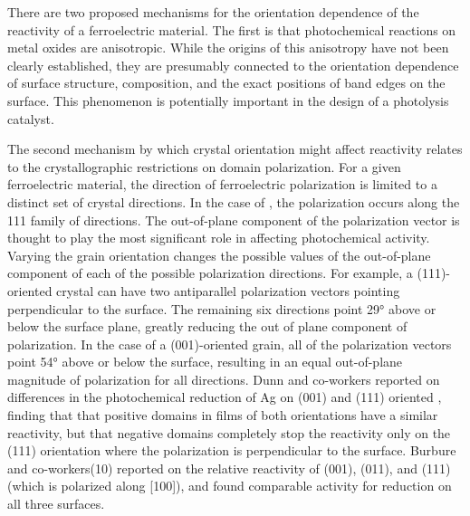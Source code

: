 There are two proposed mechanisms for the orientation dependence of the reactivity of a ferroelectric material. The first is that photochemical reactions on metal oxides are anisotropic.\cite{Giocondi:2003wc,Lowekamp:1998ks,MorrisHotsenpiller:1998jq,Ohno:2002fn,Taguchi:2003hs} While the origins of this anisotropy have not been clearly established, they are presumably connected to the orientation dependence of surface structure, composition, and the exact positions of band edges on the surface. \cite{Giocondi:2003wc,Giocondi:2007fa} This phenomenon is potentially important in the design of a photolysis catalyst.\cite{Sosnowchik:2010jr}

The second mechanism by which crystal orientation might affect reactivity relates to the crystallographic restrictions on domain polarization. For a given ferroelectric material, the direction of ferroelectric polarization is limited to a distinct set of crystal directions. In the case of , the polarization occurs along the 111 family of directions.\cite{Anonymous:2011wx} The out-of-plane component of the polarization vector is thought to play the most significant role in affecting photochemical activity. Varying the grain orientation changes the possible values of the out-of-plane component of each of the possible polarization directions. For example, a (111)-oriented crystal can have two antiparallel polarization vectors pointing perpendicular to the surface. The remaining six directions point 29\si{\degree} above or below the surface plane, greatly reducing the out of plane component of polarization. In the case of a (001)-oriented grain, all of the polarization vectors point 54\si{\degree} above or below the surface, resulting in an equal out-of-plane magnitude of polarization for all directions. Dunn and co-workers\cite{Dunn:2007cx} reported on differences in the photochemical reduction of Ag on (001) and (111) oriented , finding that that positive domains in films of both orientations have a similar reactivity, but that negative domains completely stop the reactivity only on the (111) orientation where the polarization is perpendicular to the surface. Burbure and co-workers(10) reported on the relative reactivity of (001), (011), and (111)  (which is polarized along [100]), and found comparable activity for reduction on all three surfaces.

